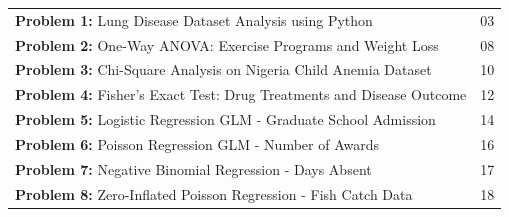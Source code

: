 \documentclass[12pt, a4paper]{article}
\begin{document}

\newpage
\pagestyle{empty}

\begin{center}
    \begin{tcolorbox}[
        colback=Parchment, 
        colframe=RoyalNavy, 
        width=0.9\textwidth, 
        arc=0mm, 
        boxrule=1.5pt, 
        leftrule=4pt, %
        titlerule=1pt,
        title={\centering\Huge\bfseries\scshape Table of Contents},
        coltitle=white,
        colbacktitle=RoyalNavy,
        fonttitle=\bfseries,
        bottomrule=1.5pt,
        toprule=1.5pt
    ]
    \vspace{0.8cm}
    \renewcommand{\arraystretch}{1.6} %
    \begin{tabular}{p{} r}
        \textbf{\color{RoyalNavy}Problem 1:} Lung Disease Dataset Analysis using Python & 03 \\
        \textbf{\color{RoyalNavy}Problem 2:} One-Way ANOVA: Exercise Programs and Weight Loss & 08 \\
        \textbf{\color{RoyalNavy}Problem 3:} Chi-Square Analysis on Nigeria Child Anemia Dataset & 10 \\
        \textbf{\color{RoyalNavy}Problem 4:} Fisher's Exact Test: Drug Treatments and Disease Outcome & 12 \\
        \textbf{\color{RoyalNavy}Problem 5:} Logistic Regression GLM - Graduate School Admission & 14\\
        \textbf{\color{RoyalNavy}Problem 6:} Poisson Regression GLM - Number of Awards & 16\\
        \textbf{\color{RoyalNavy}Problem 7:} Negative Binomial Regression - Days Absent & 17\\
        \textbf{\color{RoyalNavy}Problem 8:} Zero-Inflated Poisson Regression - Fish Catch Data & 18\\

\end{tabular}
\end{tcolorbox}
\end{center}
\end{document}
